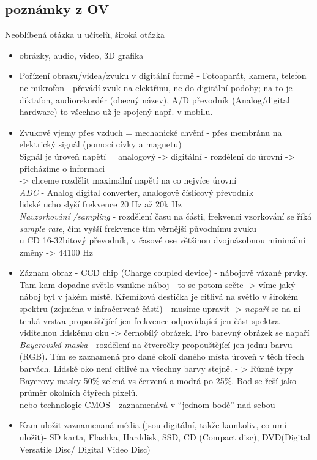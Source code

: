 \documentclass[12pt]{article}
\begin{document}
\subsection{poznámky z OV}
Neoblíbená otázka u učitelů, široká otázka
\begin{itemize}
\item obrázky, audio, video, 3D grafika
\item Pořízení obrazu/videa/zvuku v digitální formě - Fotoaparát, kamera, telefon\\
ne mikrofon - převádí zvuk na elektřinu, ne do digitální podoby; na to je diktafon, audiorekordér (obecný název), A/D převodník (Analog/digital hardware) to všechno už je spojený např. v mobilu.
\item Zvukové vjemy přes vzduch = mechanické chvění - přes membránu na elektrický signál (pomocí cívky a magnetu)\\
Signál je úroveň napětí = analogový -> digitální - rozdělení do úrovní -> přicházíme o informaci\\
-> chceme rozdělit maximální napětí na co nejvíce úrovní\\
\emph{ADC} - Analog digital converter, analogově číslicový převodník\\
lidské ucho slyší frekvence 20 Hz až 20k Hz \\
\emph{Navzorkování /sampling} - rozdělení času na části, frekvenci vzorkování se říká \emph{sample rate}, čím vyšší frekvence tím věrnější původnímu zvuku\\
u CD 16-32bitový převodník, v časové ose většinou dvojnásobnou minimální změny -> 44100 Hz
\item Záznam obraz - CCD chip (Charge coupled device) - nábojově vázané prvky.  Tam kam dopadne světlo vznikne náboj - to se potom sečte -> víme jaký náboj byl v jakém místě. Křemíková destička je citlivá na světlo v širokém spektru (zejména v infračervené části) - musíme upravit -> \emph{napaří} se na ní tenká vrstva propouštějící jen frekvence odpovídající jen část spektra viditelnou lidskému oku -> černobílý obrázek. Pro barevný obrázek se napaří \emph{Bayerovská maska} - rozdělení na čtverečky propouštějící jen jednu barvu (RGB). Tím se zaznamená pro dané okolí daného místa úroveň v těch třech barvách. Lidské oko není citlivé na všechny barvy stejně. - > Různé typy Bayerovy masky 50\% zelená vs červená a modrá po 25\%. Bod se řeší jako průměr okolních čtyřech pixelů.\\
nebo technologie CMOS - zaznamenává v ``jednom bodě'' nad sebou
\item Kam uložit zaznamenaná média (jsou digitální, takže kamkoliv, co umí uložit)- SD karta, Flashka, Harddisk, SSD, CD (Compact disc), DVD(Digital Versatile Disc/ Digital Video Disc)\\

\end{itemize}
\end{document}
